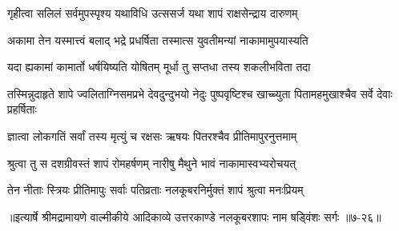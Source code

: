 \twolineshloka
{गृहीत्वा सलिलं सर्वमुपस्पृश्य यथाविधि}
{उत्ससर्ज यथा शापं राक्षसेन्द्राय दारुणम्} %

\twolineshloka
{अकामा तेन यस्मात्त्वं बलाद् भद्रे प्रधर्षिता}
{तस्मात्स युवतीमन्यां नाकामामुपयास्यति} %

\twolineshloka
{यदा ह्यकामां कामार्तो धर्षयिष्यति योषितम्}
{मूर्धा तु सप्तधा तस्य शकलीभविता तदा} %

\threelineshloka
{तस्मिन्नुदाहृते शापे ज्वलिताग्निसमप्रभे}
{देवदुन्दुभयो नेदुः पुष्पवृष्टिश्च खाच्च्युता}
{पितामहमुखाश्चैव सर्वे देवाः प्रहर्षिताः} %

\twolineshloka
{ज्ञात्वा लोकगतिं सर्वां तस्य मृत्युं च रक्षसः}
{ऋषयः पितरश्चैव प्रीतिमापुरनुत्तमाम्} %

\twolineshloka
{श्रुत्वा तु स दशग्रीवस्तं शापं रोमहर्षणम्}
{नारीषु मैथुने भावं नाकामास्वभ्यरोचयत्} %

\twolineshloka
{तेन नीताः स्त्रियः प्रीतिमापुः सर्वाः पतिव्रताः}
{नलकूबरनिर्मुक्तं शापं श्रुत्वा मनःप्रियम्} %


॥इत्यार्षे श्रीमद्रामायणे वाल्मीकीये आदिकाव्ये उत्तरकाण्डे नलकूबरशापः नाम षड्विंशः सर्गः ॥७-२६॥
